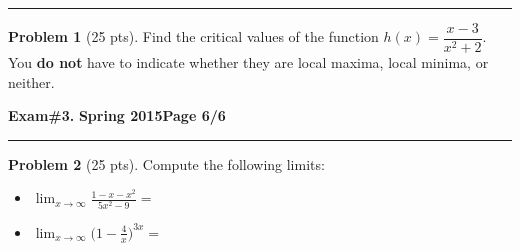 \documentclass[12pt]{article}
\theoremstyle{definition}
\newtheorem{problem}{Problem}
\begin{document}
\hrule
\begin{problem}[25 pts]
Find the critical values of the function $h(x)=\dfrac{x-3}{x^2+2}$.  You \textbf{do not} have to indicate whether they are local maxima, local minima, or neither.

\vspace{10cm}

\begin{flushright}
\end{flushright}
\end{problem}

\newpage

\hfill{\large\bf Exam\#3.}\hfill{\large\bf
  Spring 2015}\hfill{\large\bf Page 6/6}\hrule

\bigskip
\begin{problem}[25 pts] 
Compute the following limits:
\begin{itemize}
  \item[] [10 pts] $\displaystyle{\lim_{x\to\infty} \frac{1-x-x^2}{5x^2-9}} = $ \framebox[2cm][c]{\textcolor{white}{$\bigg ( $}}
  \vspace{3cm}
  \item[] [15 pts] $\displaystyle{\lim_{x\to\infty} \Big(1-\frac{4}{x} \Big)^{3x}} = $ \framebox[2cm][c]{\textcolor{white}{$\bigg ( $}}
\end{itemize}
\end{problem}
\end{document}
